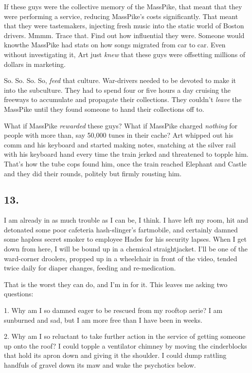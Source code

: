 If these guys were the collective memory of the MassPike, that
meant that they were performing a service, reducing MassPike’s
costs significantly. That meant that they were tastemakers,
injecting fresh music into the static world of Boston drivers.
Mmmm. Trace that. Find out how influential they were. Someone would
know{\dash}the MassPike had stats on how songs migrated from car to car.
Even without investigating it, Art just \emph{knew} that these guys
were offsetting millions of dollars in marketing.

So. So. So. So, \emph{feed} that culture. War-drivers needed to be
devoted to make it into the subculture. They had to spend four or
five hours a day cruising the freeways to accumulate and propagate
their collections. They couldn’t \emph{leave} the MassPike until
they found someone to hand their collections off to.

What if MassPike \emph{rewarded} these guys? What if MassPike
charged \emph{nothing} for people with more than, say 50,000 tunes
in their cache? Art whipped out his comm and his keyboard and
started making notes, snatching at the silver rail with his
keyboard hand every time the train jerked and threatened to topple
him. That’s how the tube cops found him, once the train reached
Elephant and Castle and they did their rounds, politely but firmly
rousting him.

\subsection{13.}

I am already in as much trouble as I can be, I think. I have left
my room, hit and detonated some poor cafeteria hash-slinger’s
fartmobile, and certainly damned some hapless secret smoker to
employee Hades for his security lapses. When I get down from here,
I will be bound up in a chemical straightjacket. I’ll be one of the
ward-corner droolers, propped up in a wheelchair in front of the
video, tended twice daily for diaper changes, feeding and
re-medication.

That is the worst they can do, and I’m in for it. This leaves me
asking two questions:

1. Why am I so damned eager to be rescued from my rooftop aerie? I
am sunburned and sad, but I am more free than I have been in
weeks.

2. Why am I so reluctant to take further action in the service of
getting someone up onto the roof? I could topple a ventilator
chimney by moving the cinderblocks that hold its apron down and
giving it the shoulder. I could dump rattling handfuls of gravel
down its maw and wake the psychotics below.

